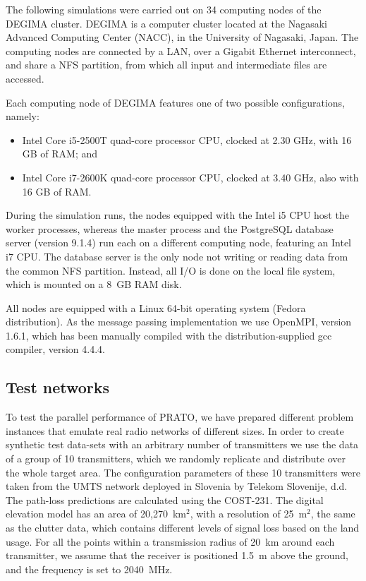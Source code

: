 The following simulations were carried out on 34 computing nodes of
the DEGIMA cluster. DEGIMA is a computer cluster located at the Nagasaki
Advanced Computing Center (NACC), in the University of Nagasaki, Japan.
The computing nodes are connected by a LAN, over a Gigabit Ethernet
interconnect, and share a NFS partition, from which all input and
intermediate files are accessed. 

Each computing node of DEGIMA features one of two possible configurations,
namely:
\begin{itemize}
\item Intel Core i5-2500T quad-core processor CPU, clocked at 2.30 GHz,
with 16 GB of RAM; and
\item Intel Core i7-2600K quad-core processor CPU, clocked at 3.40 GHz,
also with 16 GB of RAM.
\end{itemize}
During the simulation runs, the nodes equipped with the Intel i5 CPU
host the worker processes, whereas the master process and the PostgreSQL
database server (version 9.1.4) run each on a different computing
node, featuring an Intel i7 CPU. The database server is the only node
not writing or reading data from the common NFS partition. Instead,
all I/O is done on the local file system, which is mounted on a 8~GB
RAM disk.

All nodes are equipped with a Linux 64-bit operating system (Fedora
distribution). As the message passing implementation we use OpenMPI,
version 1.6.1, which has been manually compiled with the distribution-supplied
gcc compiler, version 4.4.4.


\subsection{Test networks}

To test the parallel performance of PRATO, we have prepared different
problem instances that emulate real radio networks of different sizes.
In order to create synthetic test data-sets with an arbitrary number
of transmitters we use the data of a group of 10 transmitters, which
we randomly replicate and distribute over the whole target area. The
configuration parameters of these 10 transmitters were taken from
the UMTS network deployed in Slovenia by Telekom Slovenije, d.d. The
path-loss predictions are calculated using the COST-231. The digital
elevation model has an area of 20,270~km$^{2}$, with a resolution
of 25~m$^{2}$, the same as the clutter data, which contains different
levels of signal loss based on the land usage. For all the points
within a transmission radius of 20~km around each transmitter, we
assume that the receiver is positioned 1.5~m above the ground, and
the frequency is set to 2040~MHz.


